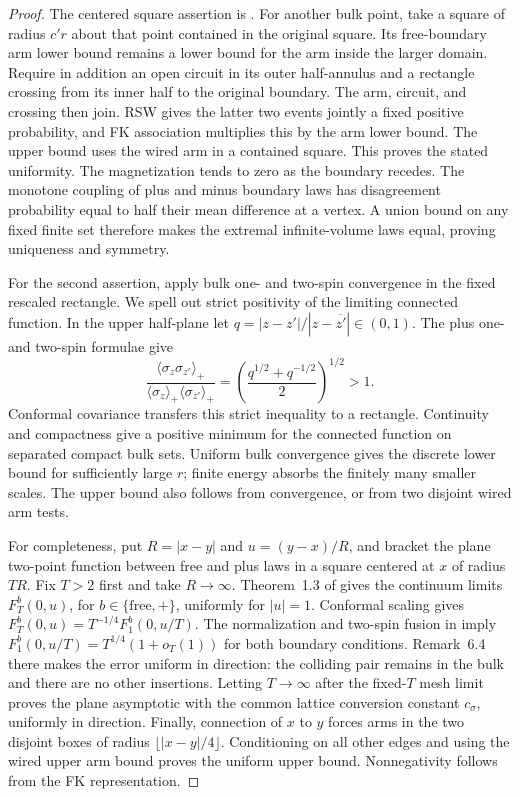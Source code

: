 \begin{proof}
The centered square assertion is
\cite[arXiv version~1, Lemma~26]{DHN2011}.
For another bulk point, take a square of radius \(c'r\) about that
point contained in the original square.  Its free-boundary arm lower
bound remains a lower bound for the arm inside the larger domain.
Require in addition an open circuit in its outer half-annulus and
a rectangle crossing from its inner half to the original boundary.
The arm, circuit, and crossing then join.  RSW gives the latter two
events jointly a fixed positive probability, and FK association
multiplies this by the arm lower bound.  The upper bound uses the
wired arm in a contained square.  This proves the stated uniformity.
The magnetization tends to zero as the boundary recedes.  The monotone
coupling of plus and minus boundary laws has disagreement probability
equal to half their mean difference at a vertex.  A union bound on any
fixed finite set therefore makes the extremal infinite-volume laws equal,
proving uniqueness and symmetry.

For the second assertion, apply bulk one- and two-spin convergence
\cite[Theorem~1.3]{CHI2021} in the fixed rescaled rectangle.  We spell out
strict positivity of the limiting connected function.  In the upper
half-plane let
\(q=|z-z'|/|z-\overline{z'}|\in(0,1)\).
The plus one- and two-spin formulae
\cite[Theorem~7.1, Equation~(7.3)]{CHI2021} give
\[
 \frac{\langle\sigma_z\sigma_{z'}\rangle_+}
      {\langle\sigma_z\rangle_+\langle\sigma_{z'}\rangle_+}
 =\left(\frac{q^{1/2}+q^{-1/2}}2\right)^{1/2}>1.
\]
Conformal covariance transfers this strict inequality to a rectangle.
Continuity and compactness give a positive minimum for the connected
function on separated compact bulk sets.  Uniform bulk convergence gives
the discrete lower bound for sufficiently large \(r\); finite energy
absorbs the finitely many smaller scales.  The upper bound also follows
from convergence, or from two disjoint wired arm tests.

For completeness, put \(R=|x-y|\) and \(u=(y-x)/R\), and bracket the
plane two-point function between free and plus laws in a square centered
at \(x\) of radius \(TR\).  Fix \(T>2\) first and take \(R\to\infty\).
Theorem~1.3 of \cite{CHI2021} gives the continuum limits
\(F_T^b(0,u)\), for \(b\in\{\mathrm{free},+\}\), uniformly for
\(|u|=1\).  Conformal scaling gives
\(F_T^b(0,u)=T^{-1/4}F_1^b(0,u/T)\).
The normalization and two-spin fusion in
\cite[Proposition~5.3, Theorem~6.3, Equation~(6.12)]{CHI2021} imply
\(F_1^b(0,u/T)=T^{1/4}(1+o_T(1))\) for both boundary conditions.
Remark~6.4 there makes the error uniform in direction: the colliding
pair remains in the bulk and there are no other insertions.  Letting
\(T\to\infty\) after the fixed-\(T\) mesh limit proves the plane
asymptotic with the common lattice conversion constant \(c_\sigma\),
uniformly in direction.  Finally, connection of \(x\) to \(y\) forces arms in the two
disjoint boxes of radius \(\lfloor|x-y|/4\rfloor\).  Conditioning on all
other edges and using the wired upper arm bound proves the uniform upper
bound.  Nonnegativity follows from the FK representation.
\end{proof}


